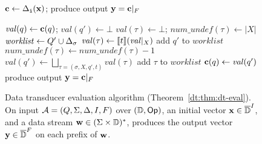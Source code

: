 \begin{figure}[t]
\vspace{-8pt}
\centering \footnotesize
\begin{algorithmic}

\State $\textbf{c} \gets \Delta_{\texttt{i}}(\textbf{x})$; produce output $\textbf{y} = \textbf{c}|_{F}$

        $\mathit{val}(q) \gets \textbf{c}(q)$;
        $\mathit{val}(q') \gets \bot$
    \EndFor
        $\mathit{val}(\tau) \gets \bot$;
        $\mathit{num\_undef}(\tau) \gets |X|$
    \EndFor
    \State $\mathit{worklist} \gets Q' \cup \Delta_\sigma$
            \State $\mathit{val}(\tau) \gets \llbracket t \rrbracket(\mathit{val}|_X)$
                add $q'$ to $\mathit{worklist}$
            \EndIf
                    $\mathit{num\_undef}(\tau) \gets \mathit{num\_undef}(\tau) - 1$
                \EndFor
            \EndIf
            \State $\mathit{val}(q') \gets \bigsqcup_{\tau = (\sigma, X, q', t)} \mathit{val}(\tau)$
                    add $\tau$ to $\mathit{worklist}$
                \EndIf
            \EndFor
        \EndIf
    \EndWhile
        $\textbf{c}(q) \gets \mathit{val}(q')$
    \EndFor
    \State produce output $\textbf{y} = \textbf{c}|_{F}$
\EndFor
\end{algorithmic}
\caption{Data transducer evaluation algorithm (Theorem~\ref{dt:thm:dt-eval}). On input $\mathcal{A} = (Q, \Sigma, \Delta, I, F)$ over $(\mathbb{D}, \textsf{Op})$, an initial vector $\textbf{x} \in \overline{\mathbb{D}{}}^I$, and a data stream $\textbf{w} \in (\Sigma \times \mathbb{D})^*$, produces the output vector $\textbf{y} \in \overline{\mathbb{D}{}}^F$ on each prefix of $\textbf{w}$.
}
\label{dt:fig:dt-eval-algorithm}
\end{figure}

